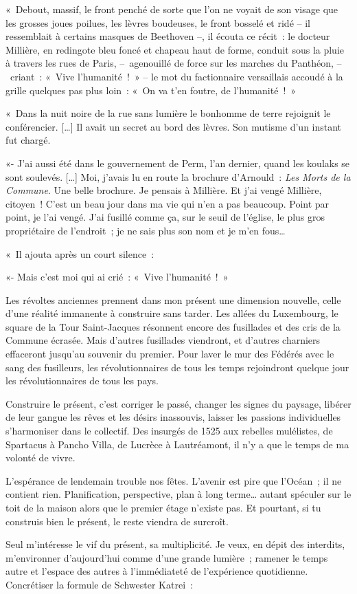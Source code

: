 \documentclass[french,twoside]{book} %
\begin{document}
« Debout, massif, le front penché de sorte que l’on ne voyait de son visage que les grosses joues poilues, les lèvres boudeuses, le front bosselé et ridé – il ressemblait à certains masques de Beethoven –, il écouta ce récit : le docteur Millière, en redingote bleu foncé et chapeau haut de forme, conduit sous la pluie à travers les rues de Paris, – agenouillé de force sur les marches du Panthéon, – criant : « Vive l’humanité ! » – le mot du factionnaire versaillais accoudé à la grille quelques pas plus loin : « On va t’en foutre, de l’humanité ! »\par
« Dans la nuit noire de la rue sans lumière le bonhomme de terre rejoignit le conférencier. […] Il avait un secret au bord des lèvres. Son mutisme d’un instant fut chargé.\par
«- J’ai aussi été dans le gouvernement de Perm, l’an dernier, quand les koulaks se sont soulevés. […] Moi, j’avais lu en route la brochure d’Arnould : \emph{Les Morts de la Commune}. Une belle brochure. Je pensais à Millière. Et j’ai vengé Millière, citoyen ! C’est un beau jour dans ma vie qui n’en a pas beaucoup. Point par point, je l’ai vengé. J’ai fusillé comme ça, sur le seuil de l’église, le plus gros propriétaire de l’endroit ; je ne sais plus son nom et je m’en fous…\par
« Il ajouta après un court silence :\par
«- Mais c’est moi qui ai crié : « Vive l’humanité ! »\par
Les révoltes anciennes prennent dans mon présent une dimension nouvelle, celle d’une réalité immanente à construire sans tarder. Les allées du Luxembourg, le square de la Tour Saint-Jacques résonnent encore des fusillades et des cris de la Commune écrasée. Mais d’autres fusillades viendront, et d’autres charniers effaceront jusqu’au souvenir du premier. Pour laver le mur des Fédérés avec le sang des fusilleurs, les révolutionnaires de tous les temps rejoindront quelque jour les révolutionnaires de tous les pays.\par
Construire le présent, c’est corriger le passé, changer les signes du paysage, libérer de leur gangue les rêves et les désirs inassouvis, laisser les passions individuelles s’harmoniser dans le collectif. Des insurgés de 1525 aux rebelles mulélistes, de Spartacus à Pancho Villa, de Lucrèce à Lautréamont, il n’y a que le temps de ma volonté de vivre.\par
L’espérance de lendemain trouble nos fêtes. L’avenir est pire que l’Océan ; il ne contient rien. Planification, perspective, plan à long terme… autant spéculer sur le toit de la maison alors que le premier étage n’existe pas. Et pourtant, si tu construis bien le présent, le reste viendra de surcroît.\par
Seul m’intéresse le vif du présent, sa multiplicité. Je veux, en dépit des interdits, m’environner d’aujourd’hui comme d’une grande lumière ; ramener le temps autre et l’espace des autres à l’immédiateté de l’expérience quotidienne. Concrétiser la formule de Schwester Katrei :\par
\end{document}
